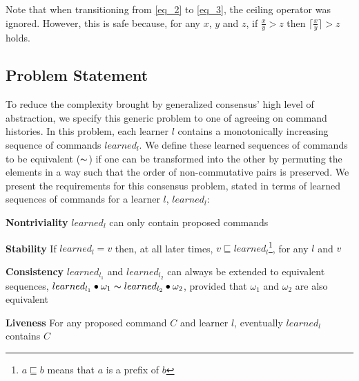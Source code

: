 Note that when transitioning from \eqref{eq_2} to \eqref{eq_3}, the ceiling operator was ignored. However, this is safe because, for any $x$, $y$ and $z$, if $\frac{x}{y} > z$ then $\lceil \frac{x}{y} \rceil > z$ holds.\par

\subsection{Problem Statement}
To reduce the complexity brought by generalized consensus' high level of abstraction, we specify this generic problem to one of agreeing on command histories. In this problem, each learner $l$ contains a monotonically increasing sequence of commands $learned_l$. We define these learned sequences of commands to be equivalent ($\thicksim$) if one can be transformed into the other by permuting the elements in a way such that the order of non-commutative pairs is preserved. We present the requirements for this consensus problem, stated in terms of learned sequences of commands for a learner $l$, $learned_l$:\par
\textbf{Nontriviality} $learned_l$ can only contain proposed commands \par
\textbf{Stability} If $learned_l = v$ then, at all later times, $v \sqsubseteq learned_l$\footnote{$a \sqsubseteq b$ means that $a$ is a prefix of $b$}, for any $l$ and $v$ \par
\textbf{Consistency} $learned_{l_1}$ and $learned_{l_2}$ can always be extended to equivalent sequences, $learned_{l_1} \bullet \omega_1 \thicksim learned_{l_2} \bullet \omega_2$, provided that $\omega_1$ and $\omega_2$ are also equivalent \par
\textbf{Liveness} For any proposed command $C$ and learner $l$, eventually $learned_l$ contains $C$ \par


